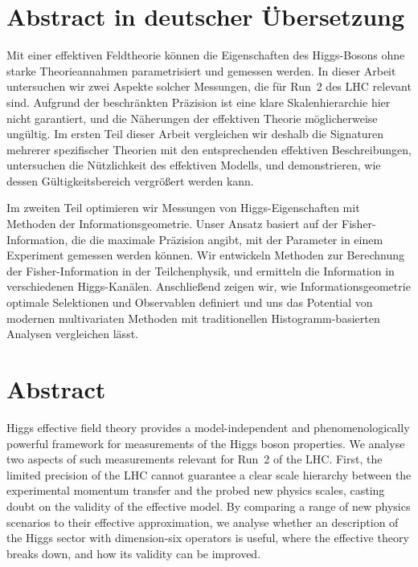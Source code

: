 


\chapter*{Abstract in deutscher \"{U}bersetzung}


Mit einer effektiven Feldtheorie k\"onnen die Eigenschaften des
Higgs-Bosons ohne starke Theorieannahmen parametrisiert und gemessen
werden. In dieser Arbeit untersuchen wir zwei Aspekte solcher
Messungen, die f\"ur Run~2 des LHC relevant sind. Aufgrund der
beschr\"ankten Pr\"azision ist eine klare Skalenhierarchie hier nicht
garantiert, und die N\"aherungen der effektiven Theorie
m\"oglicherweise ung\"ultig. Im ersten Teil dieser Arbeit vergleichen
wir deshalb die Signaturen mehrerer spezifischer Theorien mit den
entsprechenden effektiven Beschreibungen, untersuchen die
N\"utzlichkeit des effektiven Modells, und demonstrieren, wie dessen
G\"ultigkeitsbereich vergr\"o\ss{}ert werden kann.

Im zweiten Teil optimieren wir Messungen von Higgs-Eigenschaften mit
Methoden der Informationsgeometrie. Unser Ansatz basiert auf der
Fisher-Information, die die maximale Pr\"azision angibt, mit der
Parameter in einem Experiment gemessen werden k\"onnen. Wir entwickeln
Methoden zur Berechnung der Fisher-Information in der Teilchenphysik,
und ermitteln die Information in verschiedenen
Higgs-Kan\"alen. Anschlie\ss{}end zeigen wir, wie
Informationsgeometrie optimale Selektionen und Observablen definiert
und uns das Potential von modernen multivariaten Methoden mit
traditionellen Histogramm-basierten Analysen vergleichen l\"asst.




\chapter*{Abstract}


Higgs effective field theory provides a model-independent and
phenomenologically powerful framework for measurements of the Higgs
boson properties. We analyse two aspects of such measurements relevant
for Run~2 of the LHC. First, the limited precision of the LHC cannot
guarantee a clear scale hierarchy between the experimental momentum
transfer and the probed new physics scales, casting doubt on the
validity of the effective model. By comparing a range of new physics
scenarios to their effective approximation, we analyse whether an
description of the Higgs sector with dimension-six operators is
useful, where the effective theory breaks down, and how its validity
can be improved.

